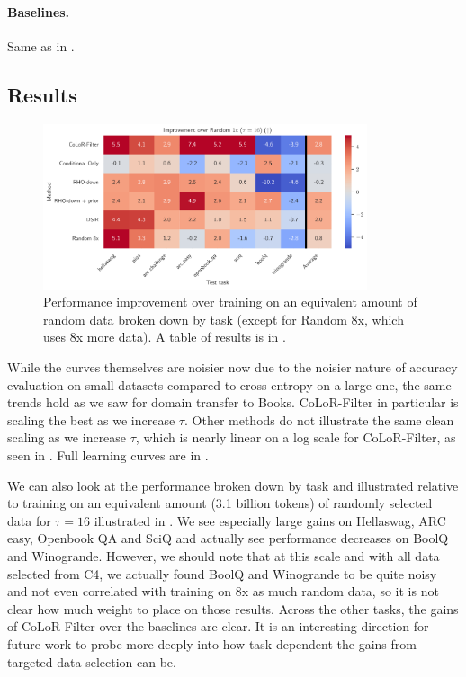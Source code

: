 \documentclass{article}
\begin{document}
\paragraph{Baselines.} Same as in .


\subsection{Results}




\begin{figure}[t]
    \centering
    \includegraphics[width=0.85\textwidth]{images/heatmap.pdf}
    \vspace{-0.2cm}
    \caption{Performance improvement over training on an equivalent amount of random data broken down by task (except for Random 8x, which uses 8x more data). A table of results is in .}
    \label{fig:heatmap}
\end{figure}





While the curves themselves are noisier now due to the noisier nature of accuracy evaluation on small datasets compared to cross entropy on a large one, the same trends hold as we saw for domain transfer to Books. CoLoR-Filter in particular is scaling the best as we increase $ \tau$. Other methods do not illustrate the same clean scaling as we increase $ \tau$, which is nearly linear on a log scale for CoLoR-Filter, as seen in . Full learning curves are in .



We can also look at the performance broken down by task and illustrated relative to training on an equivalent amount (3.1 billion tokens) of randomly selected data for $ \tau = 16$ illustrated in . We see especially large gains on Hellaswag, ARC easy, Openbook QA and SciQ and actually see performance decreases on BoolQ and Winogrande. However, we should note that at this scale and with all data selected from C4, we actually found BoolQ and Winogrande to be quite noisy and not even correlated with training on 8x as much random data, so it is not clear how much weight to place on those results. Across the other tasks, the gains of CoLoR-Filter over the baselines are clear. It is an interesting direction for future work to probe more deeply into how task-dependent the gains from targeted data selection can be.
\end{document}
